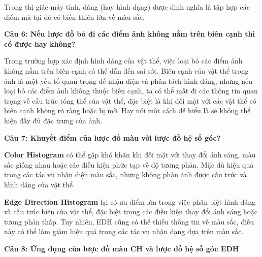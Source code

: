 Trong thị giác máy tính, dáng (hay hình dạng) được định nghĩa là tập hợp các điểm mà tại đó có biến thiên lớn về màu sắc.

\textbf{Câu 6: Nếu lược đồ bỏ đi các điểm ảnh không nằm trên biên cạnh thì có được hay không?}

Trong trường hợp xác định hình dáng của vật thể, việc loại bỏ các điểm ảnh không nằm trên biên cạnh có thể dẫn đến sai sót. Biên cạnh của vật thể trong ảnh là một yếu tố quan trọng để nhận diện và phân tách hình dáng, nhưng nếu loại bỏ các điểm ảnh không thuộc biên cạnh, ta có thể mất đi các thông tin quan trọng về cấu trúc tổng thể của vật thể, đặc biệt là khi đối mặt với các vật thể có biên cạnh không rõ ràng hoặc bị mờ. Hay nói một cách dễ hiểu là sẽ không thể hiện đầy đủ đặc trưng của ảnh.

\textbf{Câu 7: Khuyết điểm của lược đồ màu với lược đồ hệ số góc?}

\textbf{Color Histogram} có thể gặp khó khăn khi đối mặt với thay đổi ánh sáng, màu sắc giống nhau hoặc các điều kiện phức tạp về độ tương phản. Mặc dù hiệu quả trong các tác vụ nhận diện màu sắc, nhưng không phản ánh được cấu trúc và hình dáng của vật thể.

\textbf{Edge Direction Histogram} lại có ưu điểm lớn trong việc phân biệt hình dáng và cấu trúc biên của vật thể, đặc biệt trong các điều kiện thay đổi ánh sáng hoặc tương phản thấp. Tuy nhiên, EDH cũng có thể thiếu thông tin về màu sắc, điều này có thể làm giảm hiệu quả trong các tác vụ nhận dạng dựa trên màu sắc.

\textbf{Câu 8: Ứng dụng của lược đồ màu CH và lược đồ hệ số góc EDH}

